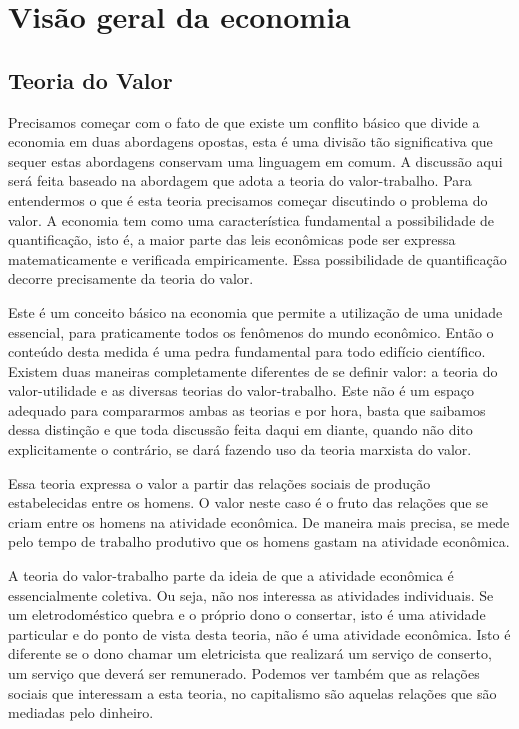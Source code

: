 \newpage
\section{Visão geral da economia}

\subsection{Teoria do Valor}

Precisamos começar com o fato de que existe um conflito básico que divide a economia em duas abordagens opostas, esta é uma divisão tão significativa que sequer estas abordagens conservam uma linguagem em comum. A discussão aqui será feita baseado na abordagem que adota a teoria do valor-trabalho. Para entendermos o que é esta teoria precisamos começar discutindo o problema do valor. A economia tem como uma característica fundamental a possibilidade de quantificação, isto é, a maior parte das leis econômicas pode ser expressa matematicamente e verificada empiricamente.  Essa possibilidade de quantificação decorre precisamente da teoria do valor.

Este é um conceito básico na economia que permite a utilização de uma unidade essencial, para praticamente todos os fenômenos do mundo econômico. Então o conteúdo desta medida é uma pedra fundamental para todo edifício científico. Existem duas maneiras completamente diferentes de se definir valor: a teoria do valor-utilidade e as diversas teorias do valor-trabalho. Este não é um espaço adequado para compararmos ambas as teorias e por hora, basta que saibamos dessa distinção e que toda discussão feita daqui em diante, quando não dito explicitamente o contrário, se dará fazendo uso da teoria marxista do valor.

Essa teoria expressa o valor a partir das relações sociais de produção estabelecidas entre os homens. O valor neste caso é o fruto das relações que se criam entre os homens na atividade econômica. De maneira mais precisa, se mede pelo tempo de trabalho produtivo que os homens gastam na atividade econômica.

A teoria do valor-trabalho parte da ideia de que a atividade econômica é essencialmente coletiva. Ou seja, não nos interessa as atividades individuais. Se um eletrodoméstico quebra e o próprio dono o consertar, isto é uma atividade particular e do ponto de vista desta teoria, não é uma atividade econômica. Isto é diferente se o dono chamar um eletricista que realizará um serviço de conserto, um serviço que deverá ser remunerado. Podemos ver também que as relações sociais que interessam a esta teoria, no capitalismo são aquelas relações que são mediadas pelo dinheiro.

